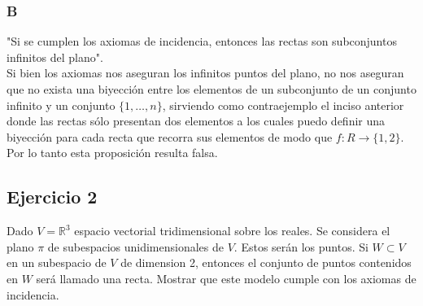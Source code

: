 \documentclass[a4paper]{article}
\begin{document}
\subsubsection{B}
"Si se cumplen los axiomas de incidencia, entonces las rectas son subconjuntos infinitos del plano".\\
Si bien los axiomas nos aseguran los infinitos puntos del plano, no nos aseguran que no exista una biyección entre los elementos de un subconjunto de un conjunto infinito y un conjunto $\{1, \dots,n\}$, sirviendo como contraejemplo el inciso anterior donde las rectas sólo presentan dos elementos a los cuales puedo definir una biyección para cada recta que recorra sus elementos de modo que $f:R\rightarrow \{1,2\}$. Por lo tanto esta proposición resulta falsa.

\subsection{Ejercicio 2}
Dado $V=\mathbb{R}^3$ espacio vectorial tridimensional sobre los reales. Se considera el plano $\pi$ de subespacios unidimensionales de $V$. Estos serán los puntos. Si $W \subset V$ en un subespacio de $V$ de dimension 2, entonces el conjunto de puntos contenidos en $W$ será llamado una recta. Mostrar que este modelo cumple con los axiomas de incidencia.\\\\
\end{document}
